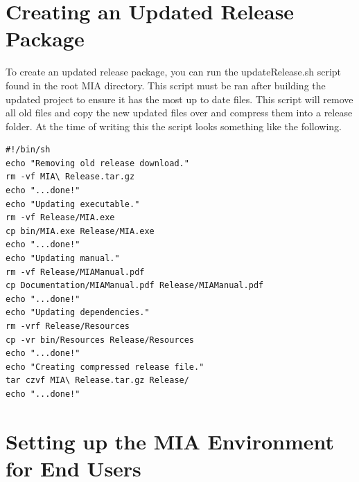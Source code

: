 \section{Creating an Updated Release Package}

To create an updated release package, you can run the updateRelease.sh script found in the root MIA directory. This script must be ran after building the updated project to ensure it has the most up to date files. This script will remove all old files and copy the new updated files over and compress them into a release folder. At the time of writing this the script looks something like the following.

\begin{lstlisting}
#!/bin/sh
echo "Removing old release download."
rm -vf MIA\ Release.tar.gz
echo "...done!"
echo "Updating executable."
rm -vf Release/MIA.exe
cp bin/MIA.exe Release/MIA.exe
echo "...done!"
echo "Updating manual."
rm -vf Release/MIAManual.pdf
cp Documentation/MIAManual.pdf Release/MIAManual.pdf
echo "...done!"
echo "Updating dependencies."
rm -vrf Release/Resources
cp -vr bin/Resources Release/Resources
echo "...done!"
echo "Creating compressed release file."
tar czvf MIA\ Release.tar.gz Release/
echo "...done!"
\end{lstlisting}

\section{Setting up the MIA Environment for End Users}

